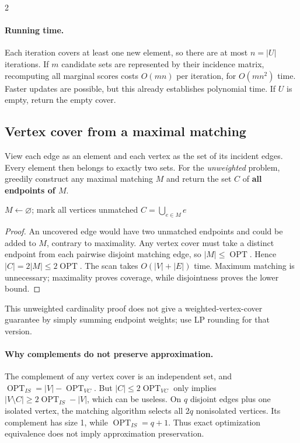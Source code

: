 \documentclass[10pt]{article}
\theoremstyle{definition}
\newcommand{\OPT}{\operatorname{OPT}}
\begin{document}
\begin{multicols*}{2}
\paragraph{Running time.}
Each iteration covers at least one new element, so there are at most $n=|U|$ iterations.
If $m$ candidate sets are represented by their incidence matrix, recomputing all marginal
scores costs $O(mn)$ per iteration, for $O(mn^2)$ time. Faster updates are possible, but this
already establishes polynomial time. If $U$ is empty, return the empty cover.


\subsection{Vertex cover from a maximal matching}
\label{gre:vc}
View each edge as an element and each vertex as the set of its incident edges. Every
element then belongs to exactly two sets. For the \emph{unweighted} problem, greedily
construct any maximal matching $M$ and return the set $C$ of \textbf{all endpoints of $M$}.

\begin{algorithm}[H]
\caption{Maximal-matching vertex cover}
$M\gets\varnothing$; mark all vertices unmatched\;
\Return $C=\bigcup_{e\in M}e$\;
\end{algorithm}
\begin{proof}
An uncovered edge would have two unmatched endpoints and could be added to $M$, contrary
to maximality. Any vertex cover must take a distinct endpoint from each pairwise disjoint
matching edge, so $|M|\le\OPT$. Hence $|C|=2|M|\le2\OPT$.
The scan takes $O(|V|+|E|)$ time. Maximum matching is unnecessary; maximality proves
coverage, while disjointness proves the lower bound.
\end{proof}
This unweighted cardinality proof does not give a weighted-vertex-cover guarantee by
simply summing endpoint weights; use LP rounding for that version.

\paragraph{Why complements do not preserve approximation.}
The complement of any vertex cover is an independent set, and $\OPT_{IS}=|V|-\OPT_{VC}$.
But $|C|\le2\OPT_{VC}$ only implies
$|V\setminus C|\ge2\OPT_{IS}-|V|$, which can be useless. On $q$ disjoint edges plus one
isolated vertex, the matching algorithm selects all $2q$ nonisolated vertices. Its complement
has size 1, while $\OPT_{IS}=q+1$. Thus exact optimization equivalence does not imply
approximation preservation.


\end{multicols*}
\end{document}
